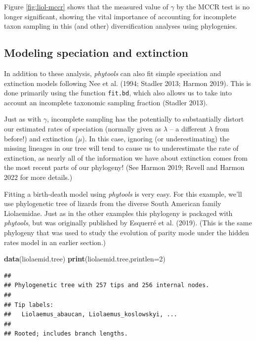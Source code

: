 \documentclass[fleqn,10pt,lineno]{wlpeerj} %
\newenvironment{Shaded}{\begin{snugshade}}{\end{snugshade}}
\newcommand{\AttributeTok}[1]{\textcolor[rgb]{0.13,0.29,0.53}{#1}}
\newcommand{\DecValTok}[1]{\textcolor[rgb]{0.00,0.00,0.81}{#1}}
\newcommand{\FunctionTok}[1]{\textcolor[rgb]{0.13,0.29,0.53}{\textbf{#1}}}
\newcommand{\NormalTok}[1]{#1}
\begin{document}
Figure \ref{fig:liol-mccr} shows that the measured value of \(\gamma\) by the MCCR test is no longer significant, showing the vital importance of accounting for incomplete taxon sampling in this (and other) diversification analyses using phylogenies.

\hypertarget{modeling-speciation-and-extinction}{%
\subsection{Modeling speciation and extinction}\label{modeling-speciation-and-extinction}}

In addition to these analysis, \emph{phytools} can also fit simple speciation and extinction models following Nee et al. (1994; Stadler 2013; Harmon 2019). This is done primarily using the function \texttt{fit.bd}, which also allows us to take into account an incomplete taxonomic sampling fraction (Stadler 2013).

Just as with \(\gamma\), incomplete sampling has the potentially to substantially distort our estimated rates of speciation (normally given as \(\lambda\) -- a different \(\lambda\) from before!) and extinction (\(\mu\)). In this case, ignoring (or underestimating) the missing lineages in our tree will tend to cause us to underestimate the rate of extinction, as nearly all of the information we have about extinction comes from the most recent parts of our phylogeny! (See Harmon 2019; Revell and Harmon 2022 for more details.)

Fitting a birth-death model using \emph{phytools} is very easy. For this example, we'll use phylogenetic tree of lizards from the diverse South American family Liolaemidae. Just as in the other examples this phylogeny is packaged with \emph{phytools}, but was originally published by Esquerré et al. (2019). (This is the same phylogeny that was used to study the evolution of parity mode under the hidden rates model in an earlier section.)

\begin{Shaded}
\begin{Highlighting}[]
\FunctionTok{data}\NormalTok{(liolaemid.tree)}
\FunctionTok{print}\NormalTok{(liolaemid.tree,}\AttributeTok{printlen=}\DecValTok{2}\NormalTok{)}
\end{Highlighting}
\end{Shaded}

\begin{verbatim}
## 
## Phylogenetic tree with 257 tips and 256 internal nodes.
## 
## Tip labels:
##   Liolaemus_abaucan, Liolaemus_koslowskyi, ...
## 
## Rooted; includes branch lengths.
\end{verbatim}
\end{document}
